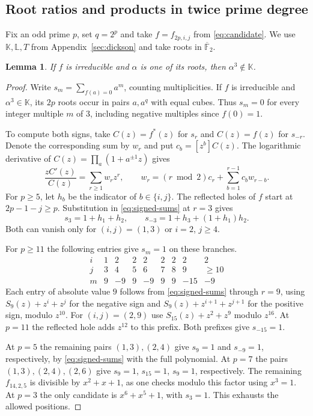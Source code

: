 \documentclass[11pt]{article}
\newtheorem{lemma}[proposition]{Lemma}
\theoremstyle{definition}
\theoremstyle{remark}
\begin{document}
\subsection{Root ratios and products in twice prime degree}\label{sec:root-ratio}
Fix an odd prime $p$, set $q=2^p$ and take $f=f_{2p,i,j}$ from
\eqref{eq:candidate}. We use $\mathbb K,\mathbb L,T$ from
Appendix~\ref{sec:dickson} and take roots in $\overline{\mathbb F}_2$.

\begin{lemma}\label{lem:cube-subfield}
If $f$ is irreducible and $\alpha$ is one of its roots, then
$\alpha^3\notin\mathbb K$.
\end{lemma}
\begin{proof}
Write $s_m=\sum_{f(a)=0}a^m$, counting multiplicities. If $f$ is
irreducible and $\alpha^3\in\mathbb K$, its $2p$ roots occur in
pairs $a,a^q$ with equal cubes. Thus $s_m=0$ for every integer
multiple $m$ of $3$, including negative multiples since $f(0)=1$.

To compute both signs, take $C(z)=f^*(z)$ for $s_r$ and $C(z)=f(z)$
for $s_{-r}$. Denote the corresponding sum by $w_r$ and put
$c_b=[z^b]C(z)$. The logarithmic derivative of
$C(z)=\prod_a(1+a^{\pm1}z)$ gives
\begin{equation}\label{eq:signed-sums}
 \frac{zC'(z)}{C(z)}=\sum_{r\ge1}w_r z^r,\qquad
 w_r=(r\bmod 2)c_r+\sum_{b=1}^{r-1}c_b w_{r-b}.
\end{equation}
For $p\ge5$, let $h_b$ be the indicator of $b\in\{i,j\}$. The
reflected holes of $f$ start at $2p-1-j\ge p$. Substitution in
\eqref{eq:signed-sums} at $r=3$ gives
\[
 s_3=1+h_1+h_2,\qquad s_{-3}=1+h_3+(1+h_1)h_2 .
\]
Both can vanish only for $(i,j)=(1,3)$ or $i=2$, $j\ge4$.

For $p\ge11$ the following entries give $s_m=1$ on these branches.
\[
\begin{array}{c|rrrrrrrr}
i&1&2&2&2&2&2&2&2\\
j&3&4&5&6&7&8&9&\ge10\\ \hline
m&9&-9&9&-9&9&9&-15&-9
\end{array}
\]
Each entry of absolute value $9$ follows from \eqref{eq:signed-sums}
through $r=9$, using $S_9(z)+z^i+z^j$ for the negative sign and
$S_9(z)+z^{i+1}+z^{j+1}$ for the positive sign, modulo $z^{10}$.
For $(i,j)=(2,9)$ use $S_{15}(z)+z^2+z^9$ modulo $z^{16}$.
At $p=11$ the reflected hole adds $z^{12}$ to this prefix.
Both prefixes give $s_{-15}=1$.

At $p=5$ the remaining pairs $(1,3),(2,4)$ give $s_9=1$ and
$s_{-9}=1$, respectively, by \eqref{eq:signed-sums} with the full
polynomial. At $p=7$ the pairs $(1,3),(2,4),(2,6)$ give $s_9=1$,
$s_{15}=1$, $s_9=1$, respectively. The remaining $f_{14,2,5}$ is
divisible by $x^2+x+1$, as one checks modulo this factor using $x^3=1$.
At $p=3$ the only candidate is $x^6+x^5+1$, with $s_3=1$.
This exhausts the allowed positions.
\end{proof}
\end{document}
